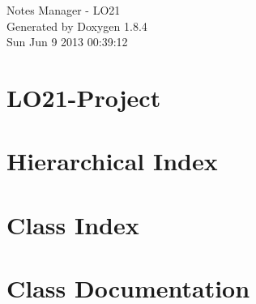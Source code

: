 \documentclass[twoside]{book}
\newcommand{\clearemptydoublepage}{%
  \newpage{\pagestyle{empty}\cleardoublepage}%
}
\begin{document}
\hypersetup{pageanchor=false}
\begin{titlepage}
\vspace*{7cm}
\begin{center}%
{\Large Notes Manager -\/ L\-O21 }\\
\vspace*{1cm}
{\large Generated by Doxygen 1.8.4}\\
\vspace*{0.5cm}
{\small Sun Jun 9 2013 00:39:12}\\
\end{center}
\end{titlepage}
\clearemptydoublepage
\tableofcontents
\clearemptydoublepage
{}
\hypersetup{pageanchor=true}

\chapter{L\-O21-\/\-Project}
\label{md_README}
\hypertarget{md_README}{}

\chapter{Hierarchical Index}

\chapter{Class Index}

\chapter{Class Documentation}














































\newpage
{}
{}
\printindex
\end{document}
